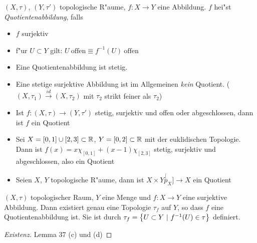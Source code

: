 \begin{dfn}
 $(X,\tau)$, $(Y, \tau')$ topologische R"aume, $f: X\to Y$ eine Abbildung. $f$
 hei"st \emph{Quotientenabbildung}, falls
 \begin{itemize}
  \item $f$ surjektiv
  \item f"ur $U \subset Y$ gilt: $U\ \text{offen} \Equiv f^{-1}(U)\ \text{offen}$
 \end{itemize}

 \begin{bem}
  \begin{itemize}
   \item Eine Quotientenabbildung ist stetig.
   \item Eine stetige surjektive Abbildung ist im Allgemeinen \emph{kein}
        Quotient. ($(X, \tau_1) \overset{id} \to (X,\tau_2)$ mit $\tau_2$ strikt
        feiner als $\tau_2$)
  \end{itemize}
 \end{bem}

 \begin{bsps}
  \begin{itemize}
   \item Ist $f:(X,\tau)\to (Y,\tau')$ stetig, surjektiv und offen oder abgeschlossen,
        dann ist $f$ ein Quotient
   \item Sei $X=[0,1]\cup [2,3] \subset \mathbb{R}$, $Y=[0,2]\subset \mathbb{R}$ mit der euklidischen
        Topologie. Dann ist $f(x)=x\chi_{[0,1]} + (x-1)\chi_{[2,3]}$ stetig,
        surjektiv und abgeschlossen, also ein Quotient
   \item Seien $X$, $Y$ topologische R"aume, dann ist $X\times Y \overset[p_X]{\to} X$
        ein Quotient
  \end{itemize}
 \end{bsps}
\end{dfn}

\begin{dfn}
  $(X,\tau)$ topologischer Raum, $Y$ eine Menge und $f:X\to Y$ eine surjektive
  Abbildung. Dann existiert genau eine Topologie $\tau_f$ auf $Y$, so dass $f$
  eine Quotientenabbildung ist. Sie ist durch $\tau_f = \mdef[U\subset Y]{f^{-1}(U)\in \tau}$
  definiert.
  \begin{proof}[Existenz]
   Lemma 37 (c) und (d)
  \end{proof}
\end{dfn}

